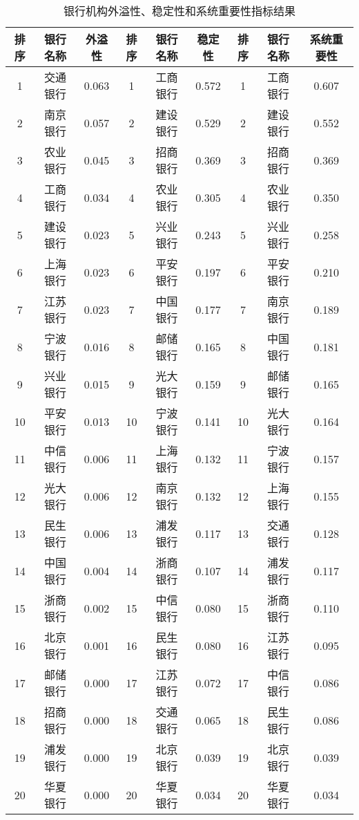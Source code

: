 \documentclass[lang=cn]{elegantpaper}
\begin{document}
\setlength{\tabcolsep}{11.2pt}
\begin{longtable}[c]{@{}ccccccccc@{}}
    \caption{银行机构外溢性、稳定性和系统重要性指标结果}
    \label{表9}\\
    \toprule
    排序 & 银行名称 & 外溢性   & 排序 & 银行名称 & 稳定性   & 排序 & 银行名称 & 系统重要性 \\ \midrule
    \endhead
    \bottomrule
    \endfoot
    \endlastfoot
    1  & 交通银行 & 0.063 & 1  & 工商银行 & 0.572 & 1  & 工商银行 & 0.607 \\
    2  & 南京银行 & 0.057 & 2  & 建设银行 & 0.529 & 2  & 建设银行 & 0.552 \\
    3  & 农业银行 & 0.045 & 3  & 招商银行 & 0.369 & 3  & 招商银行 & 0.369 \\
    4  & 工商银行 & 0.034 & 4  & 农业银行 & 0.305 & 4  & 农业银行 & 0.350 \\
    5  & 建设银行 & 0.023 & 5  & 兴业银行 & 0.243 & 5  & 兴业银行 & 0.258 \\
    6  & 上海银行 & 0.023 & 6  & 平安银行 & 0.197 & 6  & 平安银行 & 0.210 \\
    7  & 江苏银行 & 0.023 & 7  & 中国银行 & 0.177 & 7  & 南京银行 & 0.189 \\
    8  & 宁波银行 & 0.016 & 8  & 邮储银行 & 0.165 & 8  & 中国银行 & 0.181 \\
    9  & 兴业银行 & 0.015 & 9  & 光大银行 & 0.159 & 9  & 邮储银行 & 0.165 \\
    10 & 平安银行 & 0.013 & 10 & 宁波银行 & 0.141 & 10 & 光大银行 & 0.164 \\
    11 & 中信银行 & 0.006 & 11 & 上海银行 & 0.132 & 11 & 宁波银行 & 0.157 \\
    12 & 光大银行 & 0.006 & 12 & 南京银行 & 0.132 & 12 & 上海银行 & 0.155 \\
    13 & 民生银行 & 0.006 & 13 & 浦发银行 & 0.117 & 13 & 交通银行 & 0.128 \\
    14 & 中国银行 & 0.004 & 14 & 浙商银行 & 0.107 & 14 & 浦发银行 & 0.117 \\
    15 & 浙商银行 & 0.002 & 15 & 中信银行 & 0.080 & 15 & 浙商银行 & 0.110 \\
    16 & 北京银行 & 0.001 & 16 & 民生银行 & 0.080 & 16 & 江苏银行 & 0.095 \\
    17 & 邮储银行 & 0.000 & 17 & 江苏银行 & 0.072 & 17 & 中信银行 & 0.086 \\
    18 & 招商银行 & 0.000 & 18 & 交通银行 & 0.065 & 18 & 民生银行 & 0.086 \\
    19 & 浦发银行 & 0.000 & 19 & 北京银行 & 0.039 & 19 & 北京银行 & 0.039 \\
    20 & 华夏银行 & 0.000 & 20 & 华夏银行 & 0.034 & 20 & 华夏银行 & 0.034 \\ \bottomrule
\end{longtable}
\end{document}
